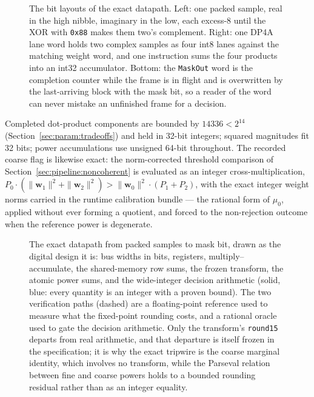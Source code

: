 \begin{figure}[t]
\centering

\caption[Bit layouts of the exact datapath]{The bit layouts of the exact datapath. Left: one packed sample, real in the high nibble, imaginary in the low, each excess-8 until the XOR with \texttt{0x88} makes them two's complement. Right: one DP4A lane word holds two complex samples as four int8 lanes against the matching weight word, and one instruction sums the four products into an int32 accumulator. Bottom: the \texttt{MaskOut} word is the completion counter while the frame is in flight and is overwritten by the last-arriving block with the mask bit, so a reader of the word can never mistake an unfinished frame for a decision.}
\label{fig:impl:bits}
\end{figure}

Completed dot-product components are bounded by $14336 < 2^{14}$ (Section~\ref{sec:param:tradeoffs}) and held in 32-bit integers; squared magnitudes fit 32 bits; power accumulations use unsigned 64-bit throughout. The recorded coarse flag is likewise exact: the norm-corrected threshold comparison of Section~\ref{sec:pipeline:noncoherent} is evaluated as an integer cross-multiplication, $P_0 \cdot (\|\mathbf{w}_1\|^2 + \|\mathbf{w}_2\|^2) > \|\mathbf{w}_0\|^2 \cdot (P_1 + P_2)$, with the exact integer weight norms carried in the runtime calibration bundle --- the rational form of $\mu_0$, applied without ever forming a quotient, and forced to the non-rejection outcome when the reference power is degenerate.

\begin{figure}[H]
\centering
\resizebox{\linewidth}{!}{}
\caption[The exact datapath, samples to mask bit]{The exact datapath from packed samples to mask bit, drawn as the digital design it is: bus widths in bits, registers, multiply--accumulate, the shared-memory row sums, the frozen transform, the atomic power sums, and the wide-integer decision arithmetic (solid, blue: every quantity is an integer with a proven bound). The two verification paths (dashed) are a floating-point reference used to measure what the fixed-point rounding costs, and a rational oracle used to gate the decision arithmetic. Only the transform's \texttt{round15} departs from real arithmetic, and that departure is itself frozen in the specification; it is why the exact tripwire is the coarse marginal identity, which involves no transform, while the Parseval relation between fine and coarse powers holds to a bounded rounding residual rather than as an integer equality.}
\label{fig:impl:datapath}
\end{figure}

